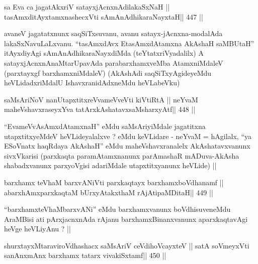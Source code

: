 \begin{shl}
sa Eva ca jagatAkxriV satayxjAcnxnAdilakaSxNaH ||
tasAmxditAyxtamxnashecxVti sAmAnAdhikaraNayxtaH\hfill || 447 ||
\end{shl}

\begin{artha}
avaneV jagatatxnunx saqSiTxsuvanu, avanu satayx-jAcnxna-modalAda
lakaSxNavuLaLxvanu. ``tasAmxdAvx EtasAmxdAtamxna AkAshaH saMBUtaH''
itAyxdiyAgi sAmAnAdhikaraNayxdiMda (teYtatxriVyadalilx) A
satayxjAcnxnAnaMtarUpavAda parabarxhamxveMba AtamxniMdaleV (parxtayxgf
barxhamxniMdaleV) (AkAshAdi saqSiTxyAgideyeMdu heVLidadxriMdalU
IshavxranidAdxneMdu heVLabeVku)
\end{artha}




\begin{shl}
saMsAriNoV nanUtapxtitxreVvameVveVti kiVtiRtA ||
neYvaM maheVshavxraseyxYva tatArx\s\s kAshatavxsaMsharxyAtf\hfill || 448 ||
\end{shl}

\begin{artha}
``EvameVvAsAmxdAtamxnaH'' eMdu saMsAriyiMdale jagatitxna
  utapxtitxyeMdeV heVLideyalalxve ? eMdu keVLidare - neYvaM =
  hAgilalx, ``ya ESoV\s natx haqRdaya AkAshaH'' eMdu
  maheVshavxranalelx AkAshatavxvanunx sivxVkarisi (parxkaqta
  paramAtamxnanunx parAmashaR mADuva-AkAsha shabadxvanunx parxyoVgisi
  adariMdale utapxtitxyanunx heVLide) ||
\end{artha}



\begin{shl}
barxhamx teV\s haM barxvANiVti parxkaqtayx barxhamxboVdhanamf ||
abarxhAmxparxkaqtaM bUrxyAtakxthaM rAjA\s tipaMDitaH\hfill || 449 ||
\end{shl}

\begin{artha}
``barxhamxteV\s haMbarxvANi'' eMdu barxhamxvanunx boVdhisuveneMdu
  AraMBisi ati pArxjacnxnAda rAjanu barxhamxBinanxvanunx
  aparxkaqtavAgi heVge heVLiyAnu ? ||
\end{artha}

\begin{shl}
shurxtayxMtaraviroVdhashacx saMsAriV ceVdihoVcayxteV ||
satA soVmeyxVti sanAnxmAnx barxhamx tatarx vivakiSxtamf\hfill || 450 ||
\end{shl}

